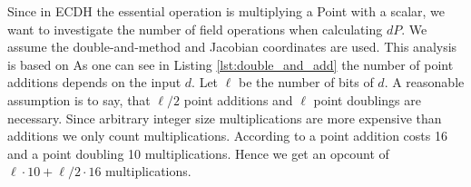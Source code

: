 Since in ECDH the essential operation is multiplying a Point with a scalar, we want to investigate the number of field operations when calculating $dP$. We assume the double-and-method and Jacobian coordinates are used. This analysis is based on \cite[p. 63]{Blake:1999} As one can see in Listing \ref{lst:double_and_add} the number of point additions depends on the input $d$. Let $\ell$ be the number of bits of $d$. A reasonable assumption is to say, that $\ell / 2$ point additions and $\ell$ point doublings are necessary. Since arbitrary integer size multiplications are more expensive than additions we only count multiplications. According to \cite[p. 59, 60]{Brown:2009} a point addition costs 16 and a point doubling 10 multiplications. Hence we get an opcount of $\ell \cdot 10 + \ell / 2 \cdot 16$ multiplications.

